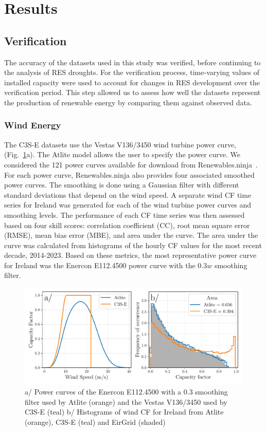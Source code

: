 \documentclass[a4paper, 11pt]{article}
\begin{document}
\section{Results}
\label{sec:Results}

\subsection{Verification}
\label{sec:verification}

The accuracy of the datasets used in this study was verified, before continuing to the analysis of RES droughts. For the verification process, time-varying values of installed capacity were used to account for changes in RES development over the verification period. This step allowed us to assess how well the datasets represent the production of renewable energy by comparing them against observed data.

\subsubsection{Wind Energy}
\label{sec:wind_verification}

The C3S-E datasets use the Vestas V136/3450 wind turbine power curve, (Fig.~\ref{fig:power_curve}a). The Atlite model allows the user to specify the power curve. We considered the 121 power curves available for download from Renewables.ninja~\cite{staffell2016wake}. For each power curve, Renewables.ninja also provides four associated smoothed power curves. The smoothing is done using a Gaussian filter with different standard deviations that depend on the wind speed. A separate wind CF time series for Ireland was generated for each of the wind turbine power curves and smoothing levels. The performance of each CF time series was then assessed based on four skill scores: correlation coefficient (CC), root mean square error (RMSE), mean bias error (MBE), and area under the curve. The area under the curve was calculated from histograms of the hourly CF values for the most recent decade, 2014-2023. Based on these metrics, the most representative power curve for Ireland was the Enercon E112.4500 power curve with the $0.3w$  smoothing filter.

\begin{figure}[!ht]
	\centering
	\includegraphics[width=\textwidth]{verification_power_curve}
	\caption{a/ Power curves of the Enercon E112.4500 with a 0.3 smoothing filter used by Atlite (orange) and the Vestas V136/3450 used by C3S-E (teal) b/ Histograms of wind CF for Ireland from Atlite (orange), C3S-E (teal) and EirGrid (shaded)}
	\label{fig:power_curve}
\end{figure}
\end{document}
